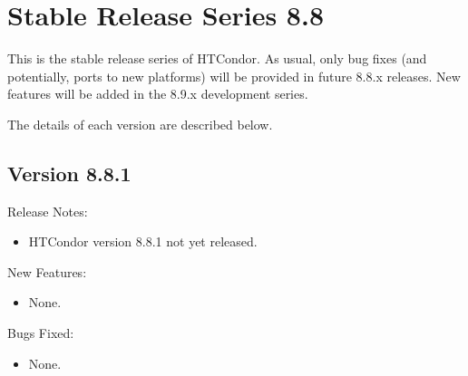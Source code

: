 
\section{Stable Release Series 8.8}\label{sec:History-8-8}

This is the stable release series of HTCondor.
As usual, only bug fixes (and potentially, ports to new platforms)
will be provided in future 8.8.x releases.
New features will be added in the 8.9.x development series.

The details of each version are described below.

\subsection*{\label{sec:New-8-8-1}Version 8.8.1}

\noindent Release Notes:

\begin{itemize}

\item HTCondor version 8.8.1 not yet released.

\end{itemize}


\noindent New Features:

\begin{itemize}

\item None.

\end{itemize}

\noindent Bugs Fixed:

\begin{itemize}

\item None.

\end{itemize}

